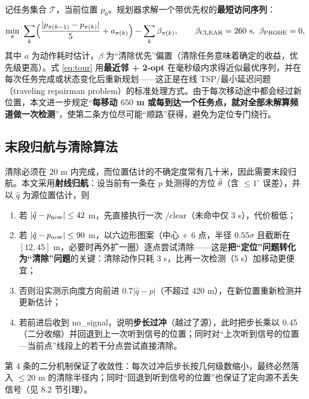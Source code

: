 \documentclass[withoutpreface,bwprint]{cumcmthesis}
\begin{document}
记任务集合 $\mathcal T$，当前位置 $p_0$。规划器求解一个带优先权的\textbf{最短访问序列}：
\begin{equation}
\min_{\pi}\ \sum_{k}\Bigl(\frac{|p_{\pi(k-1)}-p_{\pi(k)}|}{5}+a_{\pi(k)}\Bigr)
-\sum_{k}\beta_{\pi(k)},
\qquad \beta_{\text{CLEAR}}=260\ \text{s},\ \beta_{\text{PROBE}}=0,
\label{eq:tour}
\end{equation}
其中 $a$ 为动作耗时估计，$\beta$ 为“清除优先”偏置（清除任务意味着确定的收益，优先级更高）。式 \eqref{eq:tour} 用\textbf{最近邻 + 2-opt} 在毫秒级内求得近似最优序列，并在每次任务完成或状态变化后重新规划——这正是在线 TSP/最小延迟问题（traveling repairman problem）的标准处理方式\cite{ausiello2001,afrati1986,blum1994,psaraftis1995}。由于每次移动途中都会经过新位置，本文进一步规定“\textbf{每移动 $650$ m 或每到达一个任务点，就对全部未解算频道做一次检测}”，使第二条方位尽可能“顺路”获得，避免为定位专门绕行。

\subsection{末段归航与清除算法}

清除必须在 20 m 内完成，而位置估计的不确定度常有几十米，因此需要末段归航。本文采用\textbf{射线归航}：设当前有一条在 $p$ 处测得的方位 $\hat\theta$（含 $\le1^{\circ}$ 误差），并以 $\hat q$ 为源位置估计，则

\begin{enumerate}
  \item 若 $|\hat q-p_{\rm now}|\le42$ m，先直接执行一次 $\text{/clear}$（未命中仅 3 s），代价极低；
  \item 若 $|\hat q-p_{\rm now}|\le90$ m，以六边形图案（中心 + 6 点，半径 $0.55\sigma$ 且截断在 $[12,45]$ m，必要时再外扩一圈）逐点尝试清除——这是\textbf{把“定位”问题转化为“清除”问题}的关键：清除动作只耗 3 s，比再一次检测（5 s）加移动更便宜；
  \item 否则沿实测示向度方向前进 $0.7|\hat q-p|$（不超过 420 m），在新位置重新检测并更新估计；
  \item 若前进后收到 no\_signal，说明\textbf{步长过冲}（越过了源），此时把步长乘以 0.45（二分收缩）并回退到上一次听到信号的位置；同时对“上次听到信号的位置—当前点”线段上的若干分点尝试直接清除。
\end{enumerate}

第 4 条的二分机制保证了收敛性：每次过冲后步长按几何级数缩小，最终必然落入 $\le20$ m 的清除半径内；同时“回退到听到信号的位置”也保证了定向源不丢失信号（见 8.2 节引理）。
\end{document}

